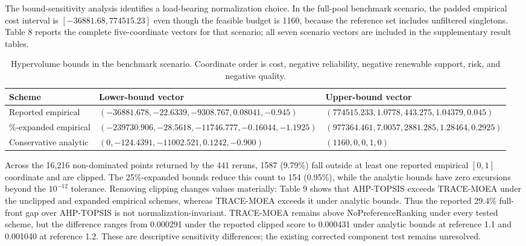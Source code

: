 \documentclass[energies,article,submit,moreauthors]{Definitions/mdpi}
\begin{document}
The bound-sensitivity analysis identifies a load-bearing normalization choice. In the full-pool benchmark scenario, the padded empirical cost interval is \([-36881.68,774515.23]\) even though the feasible budget is 1160, because the reference set includes unfiltered singletons. Table 8 reports the complete five-coordinate vectors for that scenario; all seven scenario vectors are included in the supplementary result tables.

\begin{table}[t]
\centering
\footnotesize
\setlength{\tabcolsep}{3pt}
\caption{Hypervolume bounds in the benchmark scenario. Coordinate order is cost, negative reliability, negative renewable support, risk, and negative quality.}\label{tab:8}
\begin{tabularx}{\textwidth}{@{}>{\raggedright\arraybackslash}X >{\raggedright\arraybackslash}X >{\raggedright\arraybackslash}X@{}}
\toprule
Scheme & Lower-bound vector & Upper-bound vector \\
\midrule
Reported empirical & $(-36881.678,-22.6339,-9308.767,0.08041,-0.945)$ & $(774515.233,1.0778,443.275,1.04379,0.045)$ \\
25\%-expanded empirical & $(-239730.906,-28.5618,-11746.777,-0.16044,-1.1925)$ & $(977364.461,7.0057,2881.285,1.28464,0.2925)$ \\
Conservative analytic & $(0,-124.4391,-11002.521,0.1242,-0.900)$ & $(1160,0,0,1,0)$ \\
\bottomrule
\end{tabularx}
\end{table}

Across the 16,216 non-dominated points returned by the 441 reruns, 1587 (9.79\%) fall outside at least one reported empirical \([0,1]\) coordinate and are clipped. The 25\%-expanded bounds reduce this count to 154 (0.95\%), while the analytic bounds have zero excursions beyond the \(10^{-12}\) tolerance. Removing clipping changes values materially: Table 9 shows that AHP-TOPSIS exceeds TRACE-MOEA under the unclipped and expanded empirical schemes, whereas TRACE-MOEA exceeds it under analytic bounds. Thus the reported 29.4\% full-front gap over AHP-TOPSIS is not normalization-invariant. TRACE-MOEA remains above NoPreferenceRanking under every tested scheme, but the difference ranges from 0.000291 under the reported clipped score to 0.000431 under analytic bounds at reference 1.1 and 0.001040 at reference 1.2. These are descriptive sensitivity differences; the existing corrected component test remains unresolved.
\end{document}
